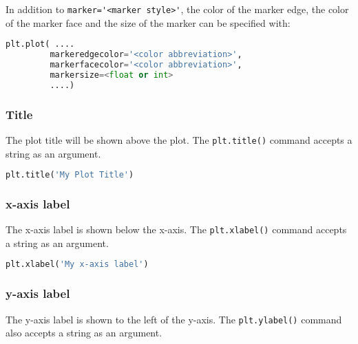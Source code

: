 \documentclass{book}
\newcommand{\passthrough}[1]{#1}
\begin{document}
In addition to \passthrough{\lstinline!marker='<marker style>'!}, the
color of the marker edge, the color of the marker face and the size of
the marker can be specified with:

\begin{lstlisting}[language=Python]
plt.plot( .... 
         markeredgecolor='<color abbreviation>',
         markerfacecolor='<color abbreviation>',
         markersize=<float or int>
         ....)
\end{lstlisting}
    




    
        \hypertarget{title}{%
\subsubsection{Title}\label{title}}

The plot title will be shown above the plot. The
\passthrough{\lstinline!plt.title()!} command accepts a string as an
argument.

\begin{lstlisting}[language=Python]
plt.title('My Plot Title')
\end{lstlisting}
    




    
        \hypertarget{x-axis-label}{%
\subsubsection{x-axis label}\label{x-axis-label}}

The x-axis label is shown below the x-axis. The
\passthrough{\lstinline!plt.xlabel()!} command accepts a string as an
argument.

\begin{lstlisting}[language=Python]
plt.xlabel('My x-axis label')
\end{lstlisting}
    




    
        \hypertarget{y-axis-label}{%
\subsubsection{y-axis label}\label{y-axis-label}}

The y-axis label is shown to the left of the y-axis. The
\passthrough{\lstinline!plt.ylabel()!} command also accepts a string as
an argument.
\end{document}
